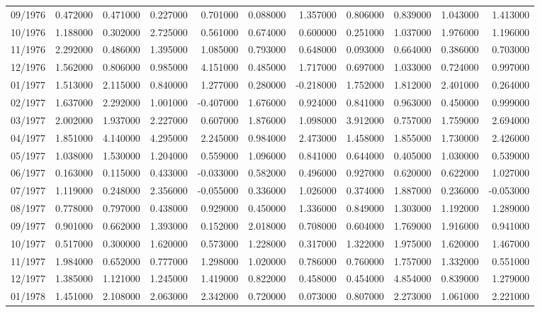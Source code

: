 \begin{tabular}{lrrrrrrrrrr}
09/1976 & 0.472000 & 0.471000 & 0.227000 & 0.701000 & 0.088000 & 1.357000 & 0.806000 & 0.839000 & 1.043000 & 1.413000 \\
10/1976 & 1.188000 & 0.302000 & 2.725000 & 0.561000 & 0.674000 & 0.600000 & 0.251000 & 1.037000 & 1.976000 & 1.196000 \\
11/1976 & 2.292000 & 0.486000 & 1.395000 & 1.085000 & 0.793000 & 0.648000 & 0.093000 & 0.664000 & 0.386000 & 0.703000 \\
12/1976 & 1.562000 & 0.806000 & 0.985000 & 4.151000 & 0.485000 & 1.717000 & 0.697000 & 1.033000 & 0.724000 & 0.997000 \\
01/1977 & 1.513000 & 2.115000 & 0.840000 & 1.277000 & 0.280000 & -0.218000 & 1.752000 & 1.812000 & 2.401000 & 0.264000 \\
02/1977 & 1.637000 & 2.292000 & 1.001000 & -0.407000 & 1.676000 & 0.924000 & 0.841000 & 0.963000 & 0.450000 & 0.999000 \\
03/1977 & 2.002000 & 1.937000 & 2.227000 & 0.607000 & 1.876000 & 1.098000 & 3.912000 & 0.757000 & 1.759000 & 2.694000 \\
04/1977 & 1.851000 & 4.140000 & 4.295000 & 2.245000 & 0.984000 & 2.473000 & 1.458000 & 1.855000 & 1.730000 & 2.426000 \\
05/1977 & 1.038000 & 1.530000 & 1.204000 & 0.559000 & 1.096000 & 0.841000 & 0.644000 & 0.405000 & 1.030000 & 0.539000 \\
06/1977 & 0.163000 & 0.115000 & 0.433000 & -0.033000 & 0.582000 & 0.496000 & 0.927000 & 0.620000 & 0.622000 & 1.027000 \\
07/1977 & 1.119000 & 0.248000 & 2.356000 & -0.055000 & 0.336000 & 1.026000 & 0.374000 & 1.887000 & 0.236000 & -0.053000 \\
08/1977 & 0.778000 & 0.797000 & 0.438000 & 0.929000 & 0.450000 & 1.336000 & 0.849000 & 1.303000 & 1.192000 & 1.289000 \\
09/1977 & 0.901000 & 0.662000 & 1.393000 & 0.152000 & 2.018000 & 0.708000 & 0.604000 & 1.769000 & 1.916000 & 0.941000 \\
10/1977 & 0.517000 & 0.300000 & 1.620000 & 0.573000 & 1.228000 & 0.317000 & 1.322000 & 1.975000 & 1.620000 & 1.467000 \\
11/1977 & 1.984000 & 0.652000 & 0.777000 & 1.298000 & 1.020000 & 0.786000 & 0.760000 & 1.757000 & 1.332000 & 0.551000 \\
12/1977 & 1.385000 & 1.121000 & 1.245000 & 1.419000 & 0.822000 & 0.458000 & 0.454000 & 4.854000 & 0.839000 & 1.279000 \\
01/1978 & 1.451000 & 2.108000 & 2.063000 & 2.342000 & 0.720000 & 0.073000 & 0.807000 & 2.273000 & 1.061000 & 2.221000 \\

\end{tabular}
